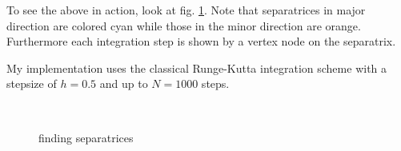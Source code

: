 \documentclass[a4paper,10pt,notitlepage]{scrartcl}
\begin{document}
To see the above in action, look at fig. \ref{fig:separatrices}. Note that
separatrices in major direction are colored cyan while those in the minor
direction are orange. Furthermore each integration step is shown by a vertex
node on the separatrix.

My implementation uses the classical Runge-Kutta integration scheme with a
stepsize of $h = 0.5$ and up to $N = 1000$ steps.

\begin{figure}
  \centering
  \\
  \caption{finding separatrices}
  \label{fig:separatrices}
\end{figure}
\end{document}
